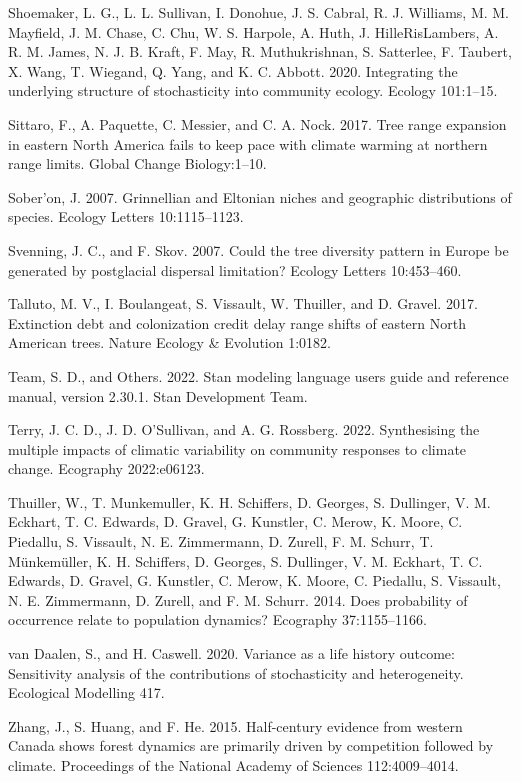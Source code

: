 \documentclass[12pt]{article}
\newlength{\cslhangindent}
\newenvironment{cslreferences}%
  {\setlength{\parindent}{0pt}%
  \everypar{\setlength{\hangindent}{\cslhangindent}}\ignorespaces}%
  {\par}
\begin{document}
\begin{cslreferences}
\leavevmode\hypertarget{ref-Shoemaker2020}{}%
Shoemaker, L. G., L. L. Sullivan, I. Donohue, J. S. Cabral, R. J.
Williams, M. M. Mayfield, J. M. Chase, C. Chu, W. S. Harpole, A. Huth,
J. HilleRisLambers, A. R. M. James, N. J. B. Kraft, F. May, R.
Muthukrishnan, S. Satterlee, F. Taubert, X. Wang, T. Wiegand, Q. Yang,
and K. C. Abbott. 2020. Integrating the underlying structure of
stochasticity into community ecology. Ecology 101:1--15.

\leavevmode\hypertarget{ref-Sittaro2017}{}%
Sittaro, F., A. Paquette, C. Messier, and C. A. Nock. 2017. Tree range
expansion in eastern North America fails to keep pace with climate
warming at northern range limits. Global Change Biology:1--10.

\leavevmode\hypertarget{ref-Soberon2007}{}%
Sober\a'on, J. 2007. Grinnellian and Eltonian niches and geographic
distributions of species. Ecology Letters 10:1115--1123.

\leavevmode\hypertarget{ref-Svenning2007}{}%
Svenning, J. C., and F. Skov. 2007. Could the tree diversity pattern in
Europe be generated by postglacial dispersal limitation? Ecology Letters
10:453--460.

\leavevmode\hypertarget{ref-Talluto2017}{}%
Talluto, M. V., I. Boulangeat, S. Vissault, W. Thuiller, and D. Gravel.
2017. Extinction debt and colonization credit delay range shifts of
eastern North American trees. Nature Ecology \& Evolution 1:0182.

\leavevmode\hypertarget{ref-stan2022stan}{}%
Team, S. D., and Others. 2022. Stan modeling language users guide and
reference manual, version 2.30.1. Stan Development Team.

\leavevmode\hypertarget{ref-Terry2022}{}%
Terry, J. C. D., J. D. O'Sullivan, and A. G. Rossberg. 2022.
Synthesising the multiple impacts of climatic variability on community
responses to climate change. Ecography 2022:e06123.

\leavevmode\hypertarget{ref-Thuiller2014}{}%
Thuiller, W., T. Munkemuller, K. H. Schiffers, D. Georges, S. Dullinger,
V. M. Eckhart, T. C. Edwards, D. Gravel, G. Kunstler, C. Merow, K.
Moore, C. Piedallu, S. Vissault, N. E. Zimmermann, D. Zurell, F. M.
Schurr, T. Münkemüller, K. H. Schiffers, D. Georges, S. Dullinger, V. M.
Eckhart, T. C. Edwards, D. Gravel, G. Kunstler, C. Merow, K. Moore, C.
Piedallu, S. Vissault, N. E. Zimmermann, D. Zurell, and F. M. Schurr.
2014. Does probability of occurrence relate to population dynamics?
Ecography 37:1155--1166.

\leavevmode\hypertarget{ref-van2020}{}%
van Daalen, S., and H. Caswell. 2020. Variance as a life history
outcome: Sensitivity analysis of the contributions of stochasticity and
heterogeneity. Ecological Modelling 417.

\leavevmode\hypertarget{ref-Zhang2015}{}%
Zhang, J., S. Huang, and F. He. 2015. Half-century evidence from western
Canada shows forest dynamics are primarily driven by competition
followed by climate. Proceedings of the National Academy of Sciences
112:4009--4014.
\end{cslreferences}


\newpage
\end{document}
